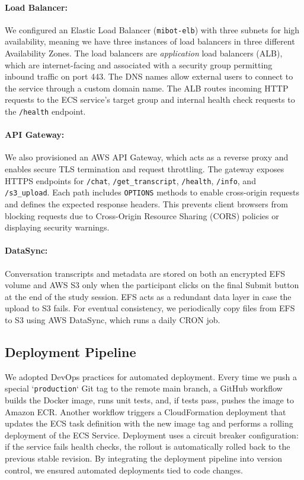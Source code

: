 \paragraph{Load Balancer:}We configured an Elastic Load Balancer (\texttt{mibot-elb}) with three subnets for high availability, meaning we have three instances of load balancers in three different Availability Zones. The load balancers are \emph{application} load balancers (ALB), which are internet-facing and associated with a security group permitting inbound traffic on port 443. The DNS names allow external users to connect to the service through a custom domain name. The ALB routes incoming HTTP requests to the ECS service's target group and internal health check requests to the \texttt{/health} endpoint.

\paragraph{API Gateway:}We also provisioned an AWS API Gateway, which acts as a reverse proxy and enables secure TLS termination and request throttling. The gateway exposes HTTPS endpoints for \texttt{/chat}, \texttt{/get\_transcript}, \texttt{/health}, \texttt{/info}, and \texttt{/s3\_upload}. Each path includes \texttt{OPTIONS} methods to enable cross-origin requests and defines the expected response headers. This prevents client browsers from blocking requests due to Cross-Origin Resource Sharing (CORS) policies or displaying security warnings.

\paragraph{DataSync:}Conversation transcripts and metadata are stored on both an encrypted EFS volume and AWS S3 only when the participant clicks on the final Submit button at the end of the study session. EFS acts as a redundant data layer in case the upload to S3 fails. For eventual consistency, we periodically copy files from EFS to S3 using AWS DataSync, which runs a daily CRON job.

\subsection{Deployment Pipeline}
We adopted DevOps practices for automated deployment. Every time we push a special `\texttt{production}` Git tag to the remote main branch, a GitHub workflow builds the Docker image, runs unit tests, and, if tests pass, pushes the image to Amazon ECR. Another workflow triggers a CloudFormation deployment that updates the ECS task definition with the new image tag and performs a rolling deployment of the ECS Service. Deployment uses a circuit breaker configuration: if the service fails health checks, the rollout is automatically rolled back to the previous stable revision. By integrating the deployment pipeline into version control, we ensured automated deployments tied to code changes.
